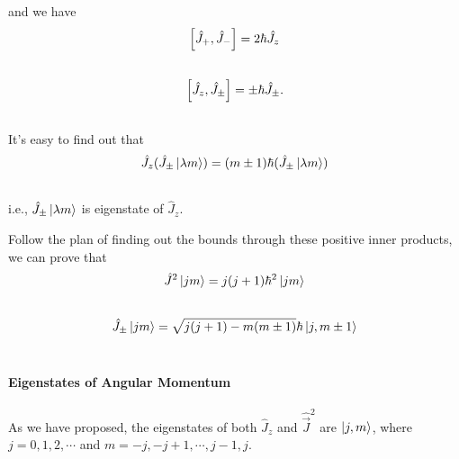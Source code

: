 \documentclass[letterpaper,10pt,english]{sphinxmanual}
\begin{document}
and we have
\begin{gather}
\begin{split}\left[\hat J_+, \hat J_-\right] = 2 \hbar \hat J_z\end{split}\notag\\\begin{split}\end{split}\notag
\end{gather}\begin{gather}
\begin{split}\left[\hat J_z, \hat J_{\pm} \right] = \pm \hbar \hat J_{\pm}.\end{split}\notag\\\begin{split}\end{split}\notag
\end{gather}
It's easy to find out that
\begin{gather}
\begin{split}\hat J_z (\hat J_{\pm}\ket{\lambda m}) = (m\pm 1) \hbar (\hat J_{\pm} \ket{\lambda m})\end{split}\notag\\\begin{split}\end{split}\notag
\end{gather}
i.e., $\hat J_{\pm}\ket{\lambda m}$ is eigenstate of $\hat J_z$.

Follow the plan of finding out the bounds through these positive inner products, we can prove that
\begin{gather}
\begin{split}\hat J^2\ket{jm} = j(j+1)\hbar^2 \ket{jm}\end{split}\notag\\\begin{split}\end{split}\notag
\end{gather}\begin{gather}
\begin{split}\hat J_{\pm}\ket{jm} = \sqrt{j(j+1)-m(m\pm 1)} \hbar \ket{j,m\pm 1}\end{split}\notag\\\begin{split}\end{split}\notag
\end{gather}

\paragraph{Eigenstates of Angular Momentum}
\label{QuantumMechanics2:eigenstates-of-angular-momentum}
As we have proposed, the eigenstates of both $\hat J_z$ and $\hat{\vec J}^2$ are $\ket{j,m}$, where $j=0,1,2,\cdots$ and $m=-j,-j+1,\cdots, j-1,j$.
\end{document}
